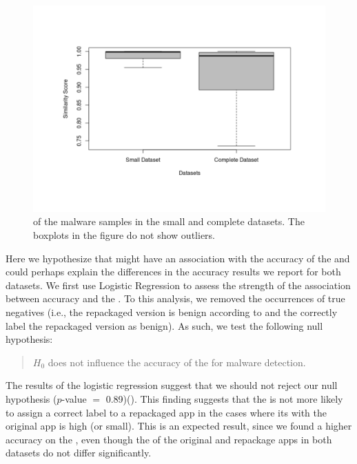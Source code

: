 \begin{figure}
  \includegraphics[width=\columnwidth]{images/boxplotSimilarity_V2.pdf}
  \caption{\sscore of the malware samples in the small and complete datasets. The boxplots in the figure do not show
  outliers.}
  \label{fig:ss}
\end{figure}

Here we hypothesize that \sscore might have an
association with the accuracy of the \mas and could perhaps explain
the differences in the accuracy results we report for both
datasets. We first use Logistic Regression to assess the strength
of the association between accuracy and
the \sscore. To this analysis, we removed the
occurrences of true negatives (i.e., the repackaged version is benign according to
\vt and the \mas correctly label the repackaged version as benign).
As such, we test the following null hypothesis:

\begin{quote}
  {\bf $H_0$} \sscore does not influence the accuracy of the
  \mas for malware detection. 
\end{quote}

The results of the logistic regression suggest that we should
not reject our null hypothesis ($p$-value $=$ 0.89)(). This finding suggests
that the \mas is not more likely to assign a correct label to
a repackaged app in the cases where its \sscore with the original
app is high (or small). This is an expected result, since
we found a higher accuracy on the \sds, even though  the
\sscore of the original and repackage apps in both datasets
do not differ significantly.

